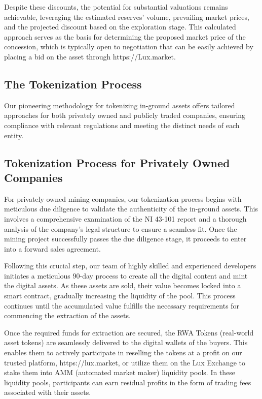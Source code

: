 \documentclass[11pt]{article}
\begin{document}
Despite these discounts, the potential for substantial valuations remains achievable, leveraging the estimated reserves' volume, prevailing market prices, and the projected discount based on the exploration stage. This calculated approach serves as the basis for determining the proposed market price of the concession, which is typically open to negotiation that can be easily achieved by placing a bid on the asset through https://Lux.market.


\subsection{The Tokenization Process}

Our pioneering methodology for tokenizing in-ground assets offers tailored approaches for both privately owned and publicly traded companies, ensuring compliance with relevant regulations and meeting the distinct needs of each entity.


\subsection{Tokenization Process for Privately Owned Companies}

For privately owned mining companies, our tokenization process begins with meticulous due diligence to validate the authenticity of the in-ground assets. This involves a comprehensive examination of the NI 43-101 report and a thorough analysis of the company's legal structure to ensure a seamless fit. Once the mining project successfully passes the due diligence stage, it proceeds to enter into a forward sales agreement.


Following this crucial step, our team of highly skilled and experienced developers initiates a meticulous 90-day process to create all the digital content and mint the digital assets. As these assets are sold, their value becomes locked into a smart contract, gradually increasing the liquidity of the pool. This process continues until the accumulated value fulfills the necessary requirements for commencing the extraction of the assets.


Once the required funds for extraction are secured, the RWA Tokens (real-world asset tokens) are seamlessly delivered to the digital wallets of the buyers. This enables them to actively participate in reselling the tokens at a profit on our trusted platform, https://lux.market, or utilize them on the Lux Exchange to stake them into AMM (automated market maker) liquidity pools. In these liquidity pools, participants can earn residual profits in the form of trading fees associated with their assets.
\end{document}
